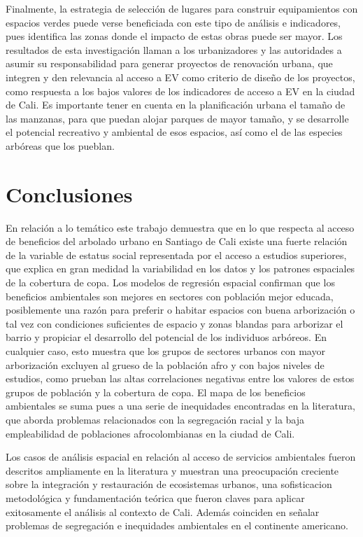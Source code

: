 \documentclass[12pt,a4paper,oneside, openany]{book}
\theoremstyle{definition}
\theoremstyle{definition}
\theoremstyle{definition}
\theoremstyle{remark}
\begin{document}
Finalmente, la estrategia de selección de lugares para construir
equipamientos con espacios verdes puede verse beneficiada con este tipo
de análisis e indicadores, pues identifica las zonas donde el impacto de
estas obras puede ser mayor. Los resultados de esta investigación llaman
a los urbanizadores y las autoridades a asumir su responsabilidad para
generar proyectos de renovación urbana, que integren y den relevancia al
acceso a EV como criterio de diseño de los proyectos, como respuesta a
los bajos valores de los indicadores de acceso a EV en la ciudad de
Cali. Es importante tener en cuenta en la planificación urbana el tamaño
de las manzanas, para que puedan alojar parques de mayor tamaño, y se
desarrolle el potencial recreativo y ambiental de esos espacios, así
como el de las especies arbóreas que los pueblan.

\chapter{Conclusiones}\label{conclusiones}

En relación a lo temático este trabajo demuestra que en lo que respecta
al acceso de beneficios del arbolado urbano en Santiago de Cali existe
una fuerte relación de la variable de estatus social representada por el
acceso a estudios superiores, que explica en gran medidad la
variabilidad en los datos y los patrones espaciales de la cobertura de
copa. Los modelos de regresión espacial confirman que los beneficios
ambientales son mejores en sectores con población mejor educada,
posiblemente una razón para preferir o habitar espacios con buena
arborización o tal vez con condiciones suficientes de espacio y zonas
blandas para arborizar el barrio y propiciar el desarrollo del potencial
de los individuos arbóreos. En cualquier caso, esto muestra que los
grupos de sectores urbanos con mayor arborización excluyen al grueso de
la población afro y con bajos niveles de estudios, como prueban las
altas correlaciones negativas entre los valores de estos grupos de
población y la cobertura de copa. El mapa de los beneficios ambientales
se suma pues a una serie de inequidades encontradas en la literatura,
que aborda problemas relacionados con la segregación racial y la baja
empleabilidad de poblaciones afrocolombianas en la ciudad de Cali.

Los casos de análisis espacial en relación al acceso de servicios
ambientales fueron descritos ampliamente en la literatura y muestran una
preocupación creciente sobre la integración y restauración de
ecosistemas urbanos, una sofisticacion metodológica y fundamentación
teórica que fueron claves para aplicar exitosamente el análisis al
contexto de Cali. Además coinciden en señalar problemas de segregación e
inequidades ambientales en el continente americano.
\end{document}
